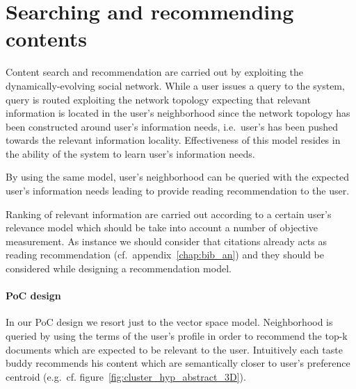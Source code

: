 \section{\label{sec:poc_searching_and_recommendations}Searching and recommending contents}
Content search and recommendation are carried out by exploiting the dynamically-evolving social network. While a user issues a query to the system, query is routed exploiting the network topology expecting that relevant information is located in the user's neighborhood since the network topology has been constructed around user's information needs, i.e.\ user's has been pushed towards the relevant information locality. Effectiveness of this model resides in the ability of the system to learn user's information needs.

By using the same model, user's neighborhood can be queried with the expected user's information needs leading to provide reading recommendation to the user. 

Ranking of relevant information are carried out according to a certain user's relevance model which should be take into account a number of objective measurement. As instance we should consider that citations already acts as reading recommendation (cf.\ appendix~\ref{chap:bib_an}) and they should be considered while designing a recommendation model.

\paragraph{PoC design} In our PoC design we resort just to the vector space model. Neighborhood is queried by using the terms of the user's profile in order to recommend the top-k documents which are expected to be relevant to the user. Intuitively each taste buddy recommends his content which are semantically closer to user's preference centroid (e.g.\ cf. figure~\ref{fig:cluster_hyp_abstract_3D}).



